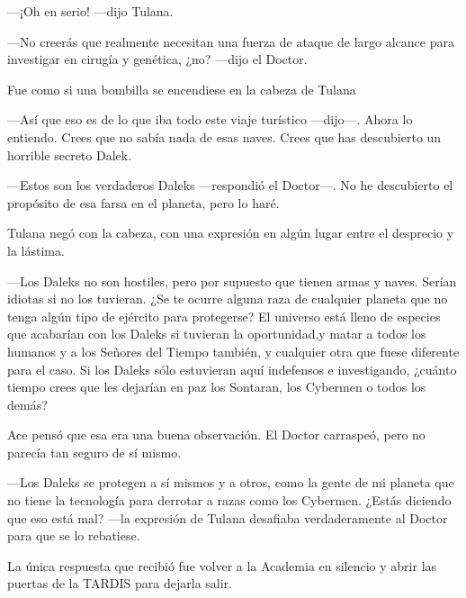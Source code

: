 ---¡Oh en serio! ---dijo Tulana.

---No creerás que realmente necesitan una fuerza de ataque de
largo alcance para investigar en cirugía y genética, ¿no? ---dijo el
Doctor.

Fue como si una bombilla se encendiese en la cabeza de Tulana

---Así que eso es de lo que iba todo este viaje turístico
---dijo---. Ahora lo entiendo. Crees que no sabía nada de esas naves.
Crees que has descubierto un horrible secreto Dalek.

---Estos son los verdaderos Daleks ---respondió el Doctor---. No
he descubierto el propósito de esa farsa en el planeta, pero lo haré.

Tulana negó con la cabeza, con una expresión en algún lugar
entre el desprecio y la lástima.

---Los Daleks no son hostiles, pero por supuesto que tienen
armas y naves. Serían idiotas si no los tuvieran. ¿Se te ocurre alguna
raza de cualquier planeta que no tenga algún tipo de ejército para
protegerse? El universo está lleno de especies que acabarían con los
Daleks si tuvieran la oportunidad,y matar a todos los humanos y a los
Señores del Tiempo también, y cualquier otra que fuese diferente para el
caso. Si los Daleks sólo estuvieran aquí indefensos e investigando,
¿cuánto tiempo crees que les dejarían en paz los Sontaran, los Cybermen
o todos los demás?

Ace pensó que esa era una buena observación. El Doctor
carraspeó, pero no parecía tan seguro de sí mismo.

---Los Daleks se protegen a sí mismos y a otros, como la gente
de mi planeta que no tiene la tecnología para derrotar a razas como los
Cybermen. ¿Estás diciendo que eso está mal? ---la expresión de Tulana
desafiaba verdaderamente al Doctor para que se lo rebatiese.

La única respuesta que recibió fue volver a la Academia en
silencio y abrir las puertas de la TARDIS para dejarla salir.